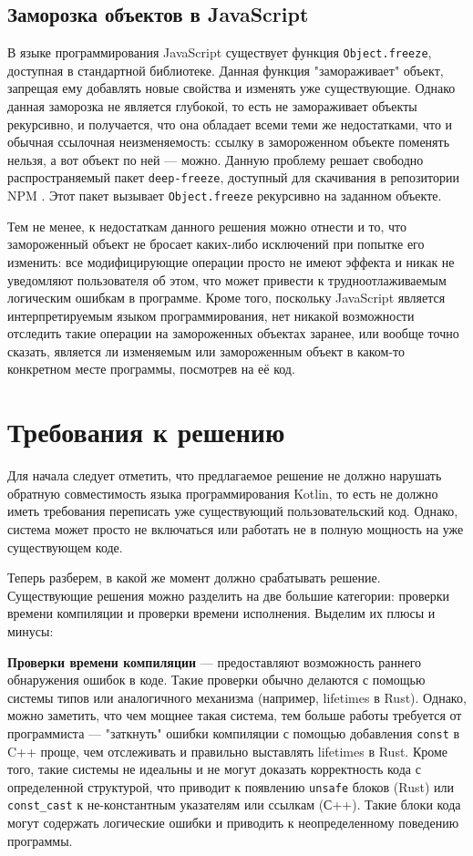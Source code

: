 \documentclass[specification,annotation,times]{itmo-student-thesis}
\begin{document}
\subsection{Заморозка объектов в JavaScript}\label{js_freeze}

В языке программирования JavaScript  \cite{EcmaScript} существует функция \texttt{Object.freeze}, доступная в стандартной библиотеке.
Данная функция "замораживает" объект, запрещая ему добавлять новые свойства и изменять уже существующие.
Однако данная заморозка не является глубокой, то есть не замораживает объекты рекурсивно, и получается, что она обладает всеми теми же недостатками, что и обычная ссылочная неизменяемость: ссылку в замороженном объекте поменять нельзя, а вот объект по ней --- можно.
Данную проблему решает свободно распространяемый пакет \texttt{deep-freeze}, доступный для скачивания в репозитории NPM \cite{js-deep-freeze}. Этот пакет вызывает \texttt{Object.freeze} рекурсивно на заданном объекте.

Тем не менее, к недостаткам данного решения можно отнести и то, что замороженный объект не бросает каких-либо исключений при попытке его изменить:
все модифицирующие операции просто не имеют эффекта и никак не уведомляют пользователя об этом, что может привести к трудноотлаживаемым логическим ошибкам в программе.
Кроме того, поскольку JavaScript является интерпретируемым языком программирования, нет никакой возможности отследить такие операции на замороженных объектах заранее, или вообще точно сказать, является ли изменяемым или замороженным объект в каком-то конкретном месте программы, посмотрев на её код.

\section{Требования к решению}

Для начала следует отметить, что предлагаемое решение не должно нарушать обратную совместимость языка программирования Kotlin, то есть не должно иметь требования переписать уже существующий пользовательский код. Однако, система может просто не включаться или работать не в полную мощность на уже существующем коде.

Теперь разберем, в какой же момент должно срабатывать решение. Существующие решения можно разделить на две большие категории: проверки времени компиляции и проверки времени исполнения.
Выделим их плюсы и минусы:

\textbf{Проверки времени компиляции} --- предоставляют возможность раннего обнаружения ошибок в коде. Такие проверки обычно делаются с помощью системы типов или аналогичного механизма (например, lifetimes в Rust).
Однако, можно заметить, что чем мощнее такая система, тем больше работы требуется от программиста --- "заткнуть" ошибки компиляции с помощью добавления \texttt{const} в C++ проще, чем отслеживать и правильно выставлять lifetimes в Rust.
Кроме того, такие системы не идеальны и не могут доказать корректность кода с определенной структурой, что приводит к появлению \texttt{unsafe} блоков (Rust) или \texttt{const\_cast} к не-константным указателям или ссылкам (С++).
Такие блоки кода могут содержать логические ошибки и приводить к неопределенному поведению программы.
\end{document}
